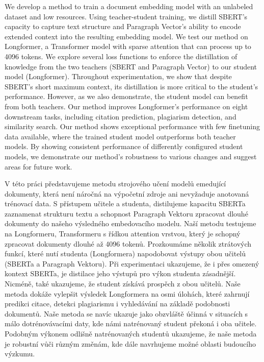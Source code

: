\documentclass[12pt]{report}
\begin{document}

We develop a method to train a document embedding model with an
unlabeled dataset and low resources. Using teacher-student training, we
distill SBERT's capacity to capture text structure and Paragraph Vector's
ability to encode extended context into the resulting embedding model. We test
our method on Longformer, a Transformer model with sparse attention that can
process up to 4096 tokens. We explore several loss functions to enforce the
distillation of knowledge from the two teachers (SBERT and Paragraph Vector) to
our student model (Longformer). Throughout experimentation, we show that
despite SBERT's short maximum context, its distillation is more critical to the
student's performance. However, as we also demonstrate, the student model can
benefit from both teachers. Our method improves Longformer's performance on
eight downstream tasks, including citation prediction, plagiarism detection,
and similarity search. Our method shows exceptional performance with few
finetuning data available, where the trained student model outperforms both
teacher models. By showing consistent performance of differently configured
student models, we demonstrate our method's robustness to various changes and
suggest areas for future work.

V této práci představujeme metodu strojového učení modelů emedující dokumenty,
která není náročná na výpočetní zdroje ani nevyžaduje anotovaná trénovací data.
S přístupem učitele a studenta, distilujeme kapacitu SBERTa zaznamenat
strukturu textu a schopnost Paragraph Vektoru zpracovat dlouhé dokumenty do
našeho výsledného embedovacího modelu. Naší metodu testujeme na Longformeru,
Transformeru s řídkou attention vrstvou, který je schopný zpracovat dokumenty
dlouhé až 4096 tokenů. Prozkoumáme několik ztrátových funkcí, které nutí
studenta (Longformera) napodobovat výstupy obou učitelů (SBERTa a Paragraph
Vektoru). Při experimentaci ukazujeme, že i přes omezený kontext SBERTa, je
distilace jeho výstupů pro výkon studenta zásadnější. Nicméně, také ukazujeme,
že student získává prospěch z obou učitelů. Naše metoda dokáže vylepšit
výsledek Longformera na osmi úlohách, které zahrnují predikci citace, detekci
plagiarismu i vyhledávání na základě podobnosti dokumentů. Naše metoda se navíc
ukazuje jako obzvláště účinná v situacích s málo dotrénovávacími daty, kde námi
natrénovaný student překoná i oba učitele. Podobným výkonem odlišně
natrénovaných studentů ukazujeme, že naše metoda je robustní vůči různým
změnám, kde dále navrhujeme možné oblasti budoucího výzkumu.
\end{document}
